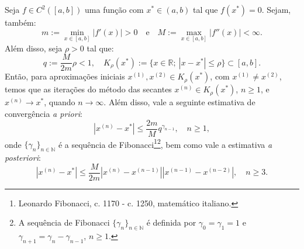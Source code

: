 \begin{teo}\label{teo:metodo_das_secantes}
  Seja $f\in C^2([a, b])$ uma função com $x^*\in (a, b)$ tal que $f(x^*) = 0$. Sejam, também:
  \begin{equation*}
    m := \min_{x\in [a, b]} |f'(x)| > 0\quad\text{e}\quad M := \max_{x\in [a,b]} |f''(x)| < \infty.
  \end{equation*}
Além disso, seja $\rho > 0$ tal que:
\begin{equation*}
  q := \frac{M}{2m}\rho < 1,\quad K_\rho(x^*) := \{x\in\mathbb{R};~|x-x^*|\leq \rho\}\subset [a, b].
\end{equation*}
Então, para aproximações iniciais $x^{(1)}, x^{(2)}\in K_\rho(x^*)$, com $x^{(1)}\neq x^{(2)}$, temos que as iterações do método das secantes $x^{(n)}\in K_\rho(x^*)$, $n\geq 1$, e $x^{(n)}\to x^*$, quando $n\to\infty$. Além disso, vale a seguinte estimativa de convergência \emph{a priori}:
\begin{equation*}
  |x^{(n)} - x^*| \leq \frac{2m}{M}q^{\gamma_{n-1}},\quad n\geq 1,
\end{equation*}
onde $\{\gamma_n\}_{n\in\mathbb{N}}$ é a sequência de Fibonacci\footnote{Leonardo Fibonacci, c. 1170 - c. 1250, matemático italiano.}\footnote{A sequência de Fibonacci $\{\gamma_n\}_{n\in\mathbb{N}}$ é definida por $\gamma_0 = \gamma_1 = 1$ e $\gamma_{n+1} = \gamma_{n} - \gamma_{n-1}$, $n\geq 1$.}, bem como vale a estimativa \emph{a posteriori}:
\begin{equation*}
  |x^{(n)} - x^*| \leq \frac{M}{2m}|x^{(n)}-x^{(n-1)}||x^{(n-1)}-x^{(n-2)}|,\quad n\geq 3.
\end{equation*}
\end{teo}
